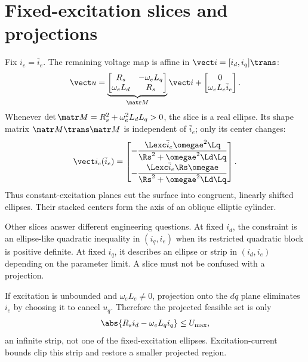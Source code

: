 \section{Fixed-excitation slices and projections}

Fix $i_e=\bar i_e$.  The remaining voltage map is affine in
$\vect i=[i_d,i_q]\trans$:
\begin{equation}
 \vect u=\underbrace{\begin{bmatrix}
 R_s&-\omega_eL_q\\ \omega_eL_d&R_s
 \end{bmatrix}}_{\matr M}\vect i
 +\begin{bmatrix}0\\\omega_eL_e\bar i_e\end{bmatrix}.
\end{equation}
Whenever $\det\matr M=R_s^2+\omega_e^2L_dL_q>0$, the slice is a real ellipse.
Its shape matrix $\matr M\trans\matr M$ is independent of $\bar i_e$; only its
center changes:
\begin{equation}
 \vect i_c(\bar i_e)=
 \begin{bmatrix}
 -\dfrac{\Lexc\bar i_e\omegae^2\Lq}{\Rs^2+\omegae^2\Ld\Lq}\\[.8em]
 -\dfrac{\Lexc\bar i_e\Rs\omegae}{\Rs^2+\omegae^2\Ld\Lq}
 \end{bmatrix}.\label{eq:slice-center}
\end{equation}
Thus constant-excitation planes cut the surface into congruent, linearly shifted
ellipses.  Their stacked centers form the axis of an oblique elliptic cylinder.



Other slices answer different engineering questions.  At fixed $i_d$, the
constraint is an ellipse-like quadratic inequality in $(i_q,i_e)$ when its
restricted quadratic block is positive definite.  At fixed $i_q$, it describes
an ellipse or strip in $(i_d,i_e)$ depending on the parameter limit.  A slice
must not be confused with a projection.

If excitation is unbounded and $\omega_eL_e\neq0$, projection onto the $dq$
plane eliminates $i_e$ by choosing it to cancel $u_q$.  Therefore the projected
feasible set is only
\begin{equation}
 \abs{R_si_d-\omega_eL_qi_q}\leq U_{\max},\label{eq:dq-projection-strip}
\end{equation}
an infinite strip, not one of the fixed-excitation ellipses.  Excitation-current
bounds clip this strip and restore a smaller projected region.


